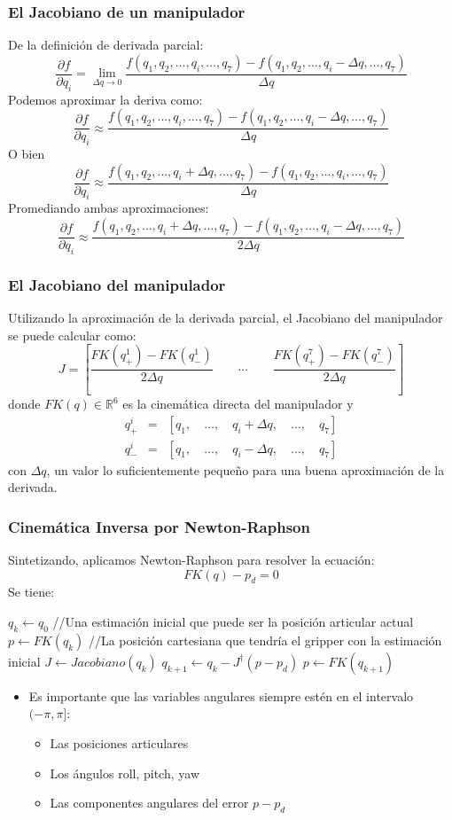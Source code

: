 \begin{frame}\frametitle{El Jacobiano de un manipulador}
  De la definición de derivada parcial:
  \[\frac{\partial f}{\partial q_i} = \lim_{\Delta q \rightarrow 0}\frac{f(q_1, q_2, \dots, q_i, \dots, q_7) -
      f(q_1, q_2,\dots,q_i-\Delta q, \dots, q_7)}{\Delta q}\]
  Podemos aproximar la deriva como:
  \[\frac{\partial f}{\partial q_i} \approx \frac{f(q_1, q_2, \dots, q_i, \dots, q_7) -
      f(q_1, q_2,\dots,q_i-\Delta q, \dots, q_7)}{\Delta q}\]
  O bien
  \[\frac{\partial f}{\partial q_i} \approx \frac{f(q_1, q_2, \dots, q_i+\Delta q, \dots, q_7) -
      f(q_1, q_2,\dots,q_i, \dots, q_7)}{\Delta q}\]
  Promediando ambas aproximaciones:
  \[\frac{\partial f}{\partial q_i} \approx \frac{f(q_1, q_2, \dots, q_i+\Delta q, \dots, q_7) -
      f(q_1, q_2,\dots,q_i-\Delta q, \dots, q_7)}{2\Delta q}\]
\end{frame}

\begin{frame}\frametitle{El Jacobiano del manipulador}
  Utilizando la aproximación de la derivada parcial, el Jacobiano del manipulador se puede calcular como:
  \[J = \left[\frac{FK(q^1_{+}) -  FK(q^1_{-})}{2\Delta q} \qquad \cdots \qquad \frac{FK(q^7_{+}) -  FK(q^7_{-})}{2\Delta q}\right]\]
  donde $FK(q)\in\mathbb{R}^6$ es la cinemática directa del manipulador y 
  \begin{eqnarray*}
    q^i_+ &=& [q_1,\quad \dots, \quad q_i + \Delta q, \quad \dots, \quad q_7]\\
    q^i_- &=& [q_1,\quad \dots, \quad q_i - \Delta q, \quad \dots, \quad q_7]
  \end{eqnarray*}
  con $\Delta q$, un valor lo suficientemente pequeño para una buena aproximación de la derivada. 

\end{frame}

\begin{frame}\frametitle{Cinemática Inversa por Newton-Raphson}
  Sintetizando, aplicamos Newton-Raphson para resolver la ecuación:
  \[FK(q) - p_d = 0\]
  Se tiene:
  \begin{algorithm}[H]
    \DontPrintSemicolon
    $q_k \leftarrow q_0$ //Una estimación inicial que puede ser la posición articular actual\;
    $p \leftarrow FK(q_k)$ //La posición cartesiana que tendría el gripper con la estimación inicial\;
    {
      $J \leftarrow Jacobiano(q_k)$     \;
      $q_{k+1} \leftarrow q_k - J^\dagger (p - p_d)$\;
      $p \leftarrow FK(q_{k+1})$ 
    }
  \end{algorithm}
  \begin{itemize}
  \item Es importante que las variables angulares siempre estén en el intervalo $(-\pi, \pi]$:
    \begin{itemize}
    \item Las posiciones articulares
    \item Los ángulos roll, pitch, yaw
    \item Las componentes angulares del error $p - p_d$
    \end{itemize}
  \end{itemize}
\end{frame}

